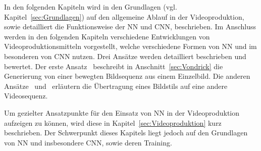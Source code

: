 \documentclass[times, 11pt,twocolumn]{article}
\begin{document}
In den folgenden Kapiteln wird in den Grundlagen (vgl. Kapitel~\ref{sec:Grundlagen}) auf den allgemeine Ablauf in der Videoproduktion, sowie detailliert die Funktionsweise der NN und CNN, beschrieben. Im Anschluss werden in den folgenden Kapiteln verschiedene Entwicklungen von Videoproduktionsmitteln vorgestellt, welche verschiedene Formen von NN und im besonderen von CNN nutzen. Drei Ansätze werden detailliert beschrieben und bewertet. Der erste Ansatz~\cite{VondrickPT16} beschreibt in Anschnitt~\ref{sec:Vondrick} die Generierung von einer bewegten Bildsequenz aus einem Einzelbild. Die anderen Ansätze~ \cite{DeepDream} und~\cite{GatysEB15a} erläutern die Übertragung eines Bildstils auf eine andere Videosequenz.


 \label{sec:Grundlagen}
Um gezielter Ansatzpunkte für den Einsatz von NN in der Videoproduktion aufzeigen zu können, wird diese in Kapitel~\ref{sec:Videoproduktion} kurz beschrieben. Der Schwerpunkt dieses Kapitels liegt jedoch auf den Grundlagen von NN und insbesondere CNN, sowie deren Training.
\end{document}
